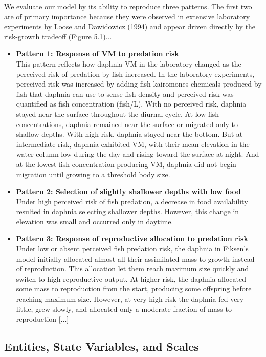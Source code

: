 {
  \color{gddarkgreenb}
  We evaluate our model by its ability to reproduce three patterns. The first two are of primary importance because they were observed in extensive laboratory experiments by Loose and Dawidowicz (1994) and appear driven directly by the risk-growth tradeoff (Figure 5.1)...

  \begin{itemize}
    \item \textbf{Pattern 1: Response of VM to predation risk} \\
    This pattern reflects how daphnia VM in the laboratory changed as the perceived risk of predation by fish increased. In the laboratory experiments, perceived risk was increased by adding fish kairomones-chemicals produced by fish that daphnia can use to sense fish density and perceived risk was quantified as fish concentration (fish/L). With no perceived risk, daphnia stayed near the surface throughout the diurnal cycle. At low fish concentrations, daphnia remained near the surface or migrated only to shallow depths. With high risk, daphnia stayed near the bottom. But at intermediate risk, daphnia exhibited VM, with their mean elevation in the water column low during the day and rising toward the surface at night. And at the lowest fish concentration producing VM, daphnia did not begin migration until growing to a threshold body size.
    \item \textbf{Pattern 2: Selection of slightly shallower depths with low food} \\
    Under high perceived risk of fish predation, a decrease in food availability resulted in daphnia selecting shallower depths. However, this change in elevation was small and occurred only in daytime.
    \item \textbf{Pattern 3: Response of reproductive allocation to predation risk} \\
    Under low or absent perceived fish predation risk, the daphnia in Fiksen's model initially allocated almost all their assimilated mass to growth instead of reproduction. This allocation let them reach maximum size quickly and switch to high reproductive output. At higher risk, the daphnia allocated some mass to reproduction from the start, producing some offspring before reaching maximum size. However, at very high risk the daphnia fed very little, grew slowly, and allocated only a moderate fraction of mass to reproduction [...]
  \end{itemize}
}

\subsection{Entities, State Variables, and Scales}


